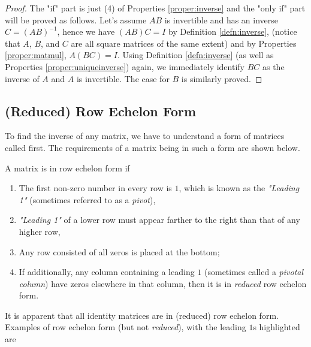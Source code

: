 \begin{proof}
The "if" part is just (4) of Properties \ref{proper:inverse} and the "only if" part will be proved as follows. Let's assume $AB$ is invertible and has an inverse $C = (AB)^{-1}$, hence we have $(AB)C = I$ by Definition \ref{defn:inverse}, (notice that $A$, $B$, and $C$ are all square matrices of the same extent) and by Properties \ref{proper:matmul}, $A(BC) = I$. Using Definition \ref{defn:inverse} (as well as Properties \ref{proper:uniqueinverse}) again, we immediately identify $BC$ as the inverse of $A$ and $A$ is invertible. The case for $B$ is similarly proved.
\end{proof}

\subsection{(Reduced) Row Echelon Form}
\label{Echelon}
To find the inverse of any matrix, we have to understand a form of matrices called  first. The requirements of a matrix being in such a form are shown below.
\begin{defn}
A matrix is in row echelon form if
\begin{enumerate}
\item The first non-zero number in every row is $1$, which is known as the \textit{"Leading 1"} (sometimes referred to as a \textit{pivot}),
\item \textit{"Leading 1"} of a lower row must appear farther to the right than that of any higher row,
\item Any row consisted of all zeros is placed at the bottom;
\item If additionally, any column containing a leading $1$ (sometimes called a \textit{pivotal column}) have zeros elsewhere in that column, then it is in \textit{reduced} row echelon form.
\end{enumerate}
\end{defn}
It is apparent that all identity matrices are in (reduced) row echelon form. Examples of row echelon form (but not \textit{reduced}), with the leading $1$s highlighted are
